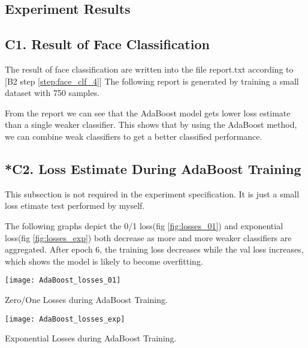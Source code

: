 \documentclass[journal, a4paper, onecolumn]{IEEEtran}
\begin{document}
\begin{multicols}{2}
\subsection{Experiment Results}

\subsection*{C1. Result of Face Classification}
The result of face classification are written into the file report.txt according to [B2 step \ref{step:face_clf_4}]
The following report is generated by training a small dataset with 750 samples.

From the report we can see that the AdaBoost model gets lower loss estimate than a single weaker classifier. This shows that by using the AdaBoost method, we can combine weak classifiers to get a better classified performance.

\subsection*{*C2. Loss Estimate During AdaBoost Training}
This subsection is not required in the experiment specification. It is just a small loss etimate test performed by myself. %

The following graphs depict the 0/1 loss(fig \ref{fig:losses_01}) and exponential loss(fig \ref{fig:losses_exp}) both decrease as more and more weaker classifiers are aggregated. After epoch 6, the training loss decreases while the val loss increases, which shows the model is likely to become overfitting.

        \begin{center}
        \captionsetup{type=figure}
        \texttt{[image: AdaBoost\_losses\_01]}
        \caption{Zero/One Losses during AdaBoost Training.}
        \label{fig:losses_01}
        \end{center}

        \begin{center}
        \captionsetup{type=figure}
        \texttt{[image: AdaBoost\_losses\_exp]}
        \caption{Exponential Losses during AdaBoost Training.}
        \label{fig:losses_exp}
        \end{center}


\end{multicols}
\end{document}
